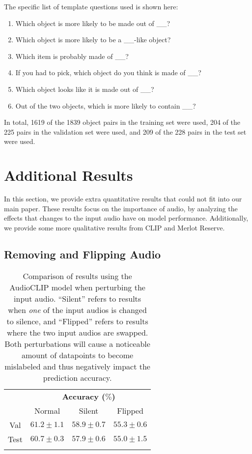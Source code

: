 \documentclass[runningheads]{llncs}
\begin{document}
The specific list of template questions used is shown here:
\begin{enumerate}
    \item Which object is more likely to be made out of \_\_?
    \item Which object is more likely to be a \_\_-like object?
    \item Which item is probably made of \_\_?
    \item If you had to pick, which object do you think is made of \_\_?
    \item Which object looks like it is made out of \_\_?
    \item Out of the two objects, which is more likely to contain \_\_?
\end{enumerate}

In total, 1619 of the 1839 object pairs in the training set were used, 204 of the 225 pairs in the validation set were used, and 209 of the 228 pairs in the test set were used. 

\section{Additional Results}\label{appendix:results}

In this section, we provide extra quantitative results that could not fit into our main paper. These results focus on the importance of audio, by analyzing the effects that changes to the input audio have on model performance. Additionally, we provide some more qualitative results from CLIP and Merlot Reserve. 


\subsection{Removing and Flipping Audio}

\begin{table}[t]
\setlength{\tabcolsep}{6pt}
\renewcommand{\arraystretch}{1.2}
\centering
\begin{tabular}{c|c|c|c}
\Xhline{3\arrayrulewidth}
\multirow{2}{*}{Subset}   & \multicolumn{3}{c}{\textbf{Accuracy ($\%$)}} \\ \cline{2-4}
     &  Normal  & Silent & Flipped \\ \hline
     Val  & $61.2 \pm 1.1$ & $58.9 \pm 0.7$ & $55.3 \pm 0.6$ \\
    Test & $60.7 \pm 0.3$ & $57.9 \pm 0.6$ & $55.0 \pm 1.5$ \\
\Xhline{3\arrayrulewidth}
\end{tabular}
\vspace{1mm}
\caption{Comparison of results using the AudioCLIP model when perturbing the input audio. ``Silent'' refers to results when \textit{one} of the input audios is changed to silence, and ``Flipped'' refers to results where the two input audios are swapped. Both perturbations will cause a noticeable amount of datapoints to become mislabeled and thus negatively impact the prediction accuracy.}
\label{table:new_results}
\end{table}
\end{document}
